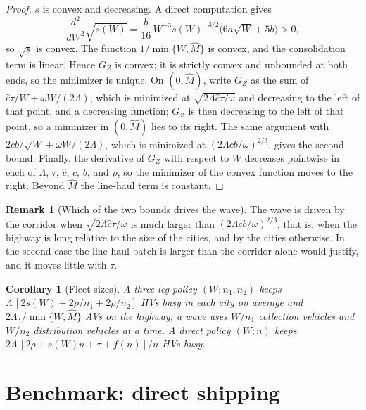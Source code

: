 \documentclass[10pt, reqno]{amsart}
\newtheorem{corollary}[proposition]{Corollary}
\theoremstyle{definition}
\newtheorem{remark}{Remark}
\begin{document}
\begin{proof}
$s$ is convex and decreasing. A direct computation gives
\[
\frac{d^2}{dW^2}\sqrt{s(W)}=\frac{b}{16}\,W^{-3}s(W)^{-3/2}\big(6a\sqrt W+5b\big)>0 ,
\]
so $\sqrt{s}$ is convex. The function $1/\min\{W,\hat M\}$ is convex, and the consolidation term is linear. Hence $G_Z$ is convex; it is strictly convex and unbounded at both ends, so the minimizer is unique. On $(0,\hat M)$, write $G_Z$ as the sum of $\hat c\tau/W+\omega W/(2\Lambda)$, which is minimized at $\sqrt{2\Lambda\hat c\tau/\omega}$ and decreasing to the left of that point, and a decreasing function; $G_Z$ is then decreasing to the left of that point, so a minimizer in $(0,\hat M)$ lies to its right. The same argument with $2cb/\sqrt W+\omega W/(2\Lambda)$, which is minimized at $(2\Lambda cb/\omega)^{2/3}$, gives the second bound. Finally, the derivative of $G_Z$ with respect to $W$ decreases pointwise in each of $\Lambda$, $\tau$, $\hat c$, $c$, $b$, and $\rho$, so the minimizer of the convex function moves to the right. Beyond $\hat M$ the line-haul term is constant.
\end{proof}

\begin{remark}[Which of the two bounds drives the wave]\label{rem:drivers}
The wave is driven by the corridor when $\sqrt{2\Lambda\hat c\tau/\omega}$ is much larger than $(2\Lambda cb/\omega)^{2/3}$, that is, when the highway is long relative to the size of the cities, and by the cities otherwise. In the second case the line-haul batch is larger than the corridor alone would justify, and it moves little with $\tau$.
\end{remark}

\begin{corollary}[Fleet sizes]\label{cor:fleet}
A three-leg policy $(W;n_1,n_2)$ keeps $\Lambda\,[2s(W)+2\rho/n_1+2\rho/n_2]$ HVs busy in each city on average and $2\Lambda\tau/\min\{W,\hat M\}$ AVs on the highway; a wave uses $W/n_1$ collection vehicles and $W/n_2$ distribution vehicles at a time. A direct policy $(W;n)$ keeps $2\Lambda\,[2\rho+s(W)n+\tau+f(n)]/n$ HVs busy.
\end{corollary}

\section{Benchmark: direct shipping}\label{sec:bench}
\end{document}
